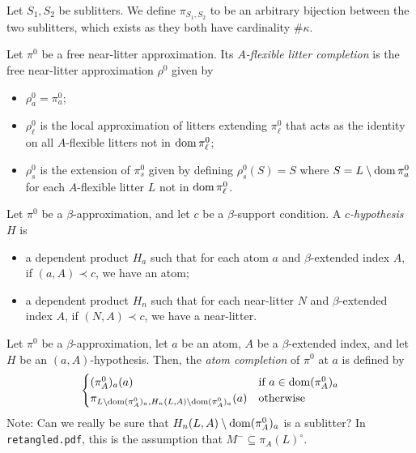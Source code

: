 \documentclass{article}
\begin{document}
\begin{definition}
    Let \( S_1, S_2 \) be sublitters.
    We define \( \pi_{S_1,S_2} \) to be an arbitrary bijection between the two sublitters, which exists as they both have cardinality \( \#\kappa \).
\end{definition}
\begin{definition}
    Let \( \pi^0 \) be a free near-litter approximation.
    Its \emph{\( A \)-flexible litter completion} is the free near-litter approximation \( \rho^0 \) given by
    \begin{itemize}
        \item \( \rho^0_a = \pi^0_a \);
        \item \( \rho^0_\ell \) is the local approximation of litters extending \( \pi^0_\ell \) that acts as the identity on all \( A \)-flexible litters not in \( \operatorname{dom} \pi^0_\ell \);
        \item \( \rho^0_s \) is the extension of \( \pi^0_s \) given by defining \( \rho^0_s(S) = S \) where \( S = L \setminus \operatorname{dom} \pi^0_a \) for each \( A \)-flexible litter \( L \) not in \( \operatorname{dom} \pi^0_\ell \).
    \end{itemize}
\end{definition}
\begin{ih}
    Let \( \pi^0 \) be a \( \beta \)-approximation, and let \( c \) be a \( \beta \)-support condition.
    A \emph{\( c \)-hypothesis} \( H \) is
    \begin{itemize}
        \item a dependent product \( H_a \) such that for each atom \( a \) and \( \beta \)-extended index \( A \), if \( (a, A) \prec c \), we have an atom;
        \item a dependent product \( H_n \) such that for each near-litter \( N \) and \( \beta \)-extended index \( A \), if \( (N, A) \prec c \), we have a near-litter.
    \end{itemize}
\end{ih}
\begin{definition}
    Let \( \pi^0 \) be a \( \beta \)-approximation, let \( a \) be an atom, \( A \) be a \( \beta \)-extended index, and let \( H \) be an \( (a, A) \)-hypothesis.
    Then, the \emph{atom completion} of \( \pi^0 \) at \( a \) is defined by
    \[ \begin{cases}
        (\pi^0_A)_a(a) & \text{if } a \in \operatorname{dom} (\pi^0_A)_a \\
        \pi_{L \setminus \operatorname{dom} (\pi^0_A)_a, H_n(L, A) \setminus \operatorname{dom} (\pi^0_A)_a}(a) & \text{otherwise}
    \end{cases} \]
    Note: Can we really be sure that \( H_n(L, A) \setminus \operatorname{dom} (\pi^0_A)_a \) is a sublitter?
    In \texttt{retangled.pdf}, this is the assumption that \( M^- \subseteq \pi_A(L)^\circ \).
\end{definition}
\end{document}
